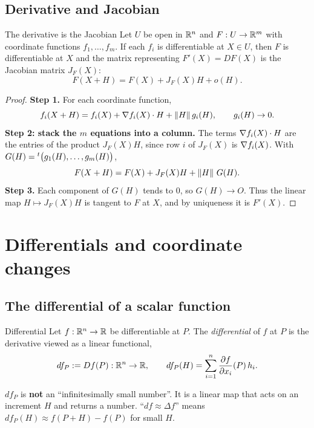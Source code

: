 \subsection{Derivative and Jacobian}

\begin{theorem}[label=thm:jac]{The derivative is the Jacobian}
Let $U$ be open in $\mathbb{R}^n$ and $F:U\to\mathbb{R}^m$ with coordinate functions $f_1,\dots,f_m$. If each
$f_i$ is differentiable at $X\in U$, then $F$ is differentiable at $X$ and the matrix
representing $F'(X)=DF(X)$ is the Jacobian matrix $J_F(X)$:
\[ F(X+H)=F(X)+J_F(X)H+o(H). \]
\end{theorem}

\begin{proof}
\textbf{Step 1.} For each coordinate function,
\[ f_i(X+H)=f_i(X)+\nabla f_i(X)\cdot H+\left\lVert H\right\rVert g_i(H),\qquad g_i(H)\to0 . \]
\textbf{Step 2: stack the $m$ equations into a column.} The terms $\nabla f_i(X)\cdot H$ are the
entries of the product $J_F(X)H$, since row $i$ of $J_F(X)$ is $\nabla f_i(X)$. With
$G(H)={}^{t}\big(g_1(H),\dots,g_m(H)\big)$,
\[ F(X+H)=F(X)+J_F(X)H+\left\lVert H\right\rVert\,G(H). \]
\textbf{Step 3.} Each component of $G(H)$ tends to $0$, so $G(H)\to O$. Thus the linear map
$H\mapsto J_F(X)H$ is tangent to $F$ at $X$, and by uniqueness it is $F'(X)$.
\end{proof}

\section{Differentials and coordinate changes}

\subsection{The differential of a scalar function}

\begin{definition}{Differential}
Let $f:\mathbb{R}^n\to\mathbb{R}$ be differentiable at $P$. The \emph{differential} of $f$ at $P$ is the derivative
viewed as a linear functional,
\[ df_P:=Df(P):\mathbb{R}^n\to\mathbb{R},\qquad df_P(H)=\sum_{i=1}^n\frac{\partial f}{\partial x_i}(P)\,h_i . \]
\end{definition}

\begin{trap}
$df_P$ is \textbf{not} an ``infinitesimally small number''. It is a linear map that acts on an
increment $H$ and returns a number. ``$df\approx\Delta f$'' means $df_P(H)\approx f(P+H)-f(P)$ for small $H$.
\end{trap}

